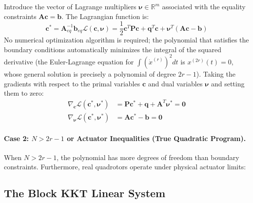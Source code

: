 \documentclass[11pt,a4paper]{article}
\begin{document}
Introduce the vector of Lagrange multipliers $\boldsymbol{\nu} \in \mathbb{R}^m$ associated with the equality constraints $\mathbf{A}\mathbf{c} = \mathbf{b}$. The Lagrangian function is:
\begin{equation}
\mathbf{c}^* = \mathbf{A}_{eq}^{-1} \mathbf{b}_{eq}
\mathcal{L}(\mathbf{c}, \boldsymbol{\nu}) = \frac{1}{2} \mathbf{c}^T \mathbf{P} \mathbf{c} + \mathbf{q}^T \mathbf{c} + \boldsymbol{\nu}^T (\mathbf{A}\mathbf{c} - \mathbf{b})
\end{equation}
No numerical optimization algorithm is required; the polynomial that satisfies the boundary conditions automatically minimizes the integral of the squared derivative (the Euler-Lagrange equation for $\int (\dot{x}^{(r)})^2 dt$ is $x^{(2r)}(t) = 0$, whose general solution is precisely a polynomial of degree $2r-1$).
Taking the gradients with respect to the primal variables $\mathbf{c}$ and dual variables $\boldsymbol{\nu}$ and setting them to zero:
\begin{align}
\nabla_{\mathbf{c}} \mathcal{L}(\mathbf{c}^*, \boldsymbol{\nu}^*) &= \mathbf{P} \mathbf{c}^* + \mathbf{q} + \mathbf{A}^T \boldsymbol{\nu}^* = \mathbf{0} \label{eq:kkt_stationarity} \\
\nabla_{\boldsymbol{\nu}} \mathcal{L}(\mathbf{c}^*, \boldsymbol{\nu}^*) &= \mathbf{A} \mathbf{c}^* - \mathbf{b} = \mathbf{0} \label{eq:kkt_primal_feasibility}
\end{align}

\paragraph{Case 2: \texorpdfstring{$N > 2r - 1$}{N > 2r - 1} or Actuator Inequalities (True Quadratic Program).}
When $N > 2r - 1$, the polynomial has more degrees of freedom than boundary constraints. Furthermore, real quadrotors operate under physical actuator limits:
\subsection{The Block KKT Linear System}
\end{document}
